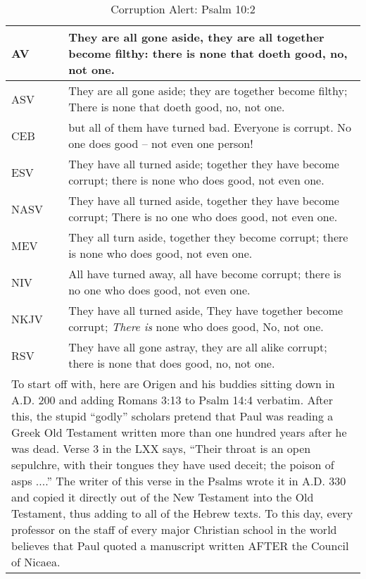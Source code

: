 
\begin{center}

\begin{table}[ht]
\centering
\begin{tabular}{|p{.5in}|p{3.5in}|}
    \hline

\textcolor[rgb]{0.00,0.00,1.00}{AV} & \textcolor[rgb]{0.00,0.00,1.00}{They are all gone aside, they are all together become filthy: there is none that doeth good, no, not one.} \\ \hline
ASV & They are all gone aside; they are together become filthy;
There is none that doeth good, no, not one.\\ \hline
%
CEB &  but all of them have turned bad. Everyone is corrupt. No one does good -- not even one person!\\ \hline
ESV & They have all turned aside; together they have become corrupt; there is none who does good, not even one.\\ \hline
%
NASV &  They have all turned aside, together they have become corrupt; There is no one who does good, not even one.\\ \hline
%
MEV & They all turn aside, together they become corrupt; there is none who does good, not even one. \\ \hline
%
NIV & All have turned away, all have become corrupt;  there is no one who does good,  not even one. \\ \hline
%
NKJV &  They have all turned aside, They have together become corrupt; \emph{There is} none who does good, No, not one.\\ \hline
%
RSV &   They have all gone astray, they are all alike corrupt; there is none that does good,  no, not one.\\ \hline

\multicolumn{2}{p{4.0in}}{{To start off with, here are Origen and his buddies sitting down in A.D. 200 and adding Romans 3:13 to Psalm 14:4 verbatim. After this, the stupid ``godly'' scholars pretend that Paul was reading a Greek Old Testament written more than one hundred years after he was dead.  Verse 3 in the LXX says, ``Their throat is an open sepulchre, with their tongues they have used deceit; the poison of asps ....''  The writer of this verse in the Psalms wrote it in A.D. 330 and copied it directly out of the New Testament into the Old Testament, thus adding to all of the Hebrew texts. To this day, every professor on the staff of every major Christian school in the world believes that Paul quoted a manuscript written AFTER the Council of Nicaea.\cite{Ruckman1992psalms}}} \\ \end{tabular}

\caption[Corruption Alert: Psalm 10:2]{Corruption Alert: Psalm 10:2} \label{table:Corruption Psalm 10:2}
\end{table}

\end{center}



